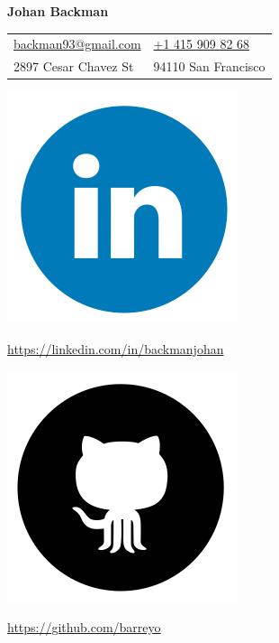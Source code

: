 \documentclass{cv_doc}
\begin{document}
\textbf{{\sffamily\huge Johan Backman}} \\

\begin{tabular}{@{}l l }
 \href{mailto:backman93@gmail.com}{backman93@gmail.com} & \href{tel:14159098268}{+1 415 909 82 68} \\
 2897 Cesar Chavez St & 94110 San Francisco \\
\end{tabular}

\vspace{0.05cm}

\begin{minipage}[c]{0.03\textwidth}
\includegraphics[scale=0.04]{linkedin}
\end{minipage}
\begin{minipage}[c]{0.25\textwidth}
{\small \href{linkedin.com/in/backmanjohan}{https://linkedin.com/in/backmanjohan}}
\end{minipage}

\begin{minipage}[c]{0.03\textwidth}
\includegraphics[scale=0.04]{github}
\end{minipage}
\begin{minipage}[c]{0.25\textwidth}
{\small \href{github.com/barreyo}{https://github.com/barreyo}}
\end{minipage}
\end{document}
